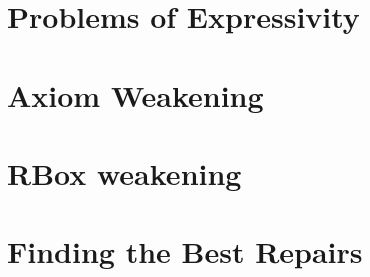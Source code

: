 \section{Problems of Expressivity} \label{expressivity-problems}



\section{Axiom Weakening} \label{axiom-weakening}



\section{RBox weakening} \label{rbox-weakening}



\section{Finding the Best Repairs} \label{best-repair}


